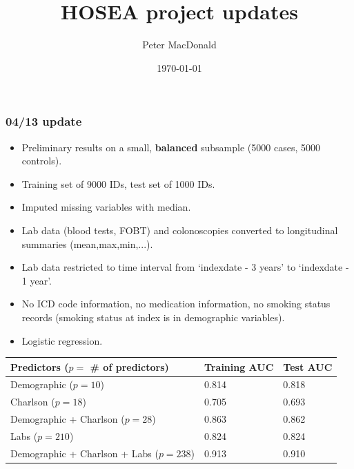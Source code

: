 \documentclass[12pt]{article}
\title{HOSEA project updates}
\author{Peter MacDonald}
\date{\today}
\begin{document}

\subsubsection*{04/13 update}

\begin{itemize}
  \item Preliminary results on a small, {\bf balanced} subsample (5000 cases, 5000 controls).
  \item Training set of 9000 IDs, test set of 1000 IDs.
  \item Imputed missing variables with median.
  \item Lab data (blood tests, FOBT) and colonoscopies converted to longitudinal summaries (mean,max,min,...).
  \item Lab data restricted to time interval from `indexdate - 3 years' to `indexdate - 1 year'.
  \item No ICD code information, no medication information, no smoking status records (smoking status at index is in demographic variables).
  \item Logistic regression.
\end{itemize}

\begin{center}
\begin{table}[h!!]
\begin{tabular}{|l|l|l|}
\hline
\textbf{Predictors ($p=$ \# of predictors)}                                                & \textbf{Training AUC} & \textbf{Test AUC} \\ \hline
Demographic ($p=10$)                                     & 0.814                 & 0.818             \\ \hline
Charlson ($p=18$)                                     & 0.705               & 0.693         \\ \hline
Demographic + Charlson ($p=28$)             & 0.863                 & 0.862             \\ \hline
Labs ($p=210$)                                                 & 0.824                 & 0.824             \\ \hline
Demographic + Charlson + Labs ($p=238$) & 0.913                 & 0.910             \\ \hline
\end{tabular}
\end{table}
\end{center}
\end{document}
